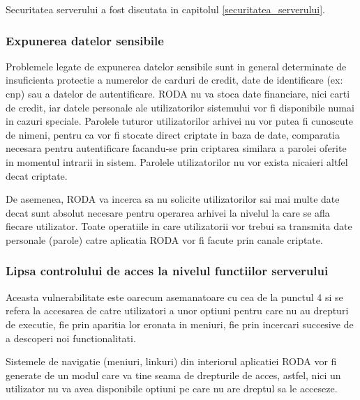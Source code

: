 {\sffamily\color{black}
Securitatea serverului a fost discutata in capitolul
\ref{securitatea_serverului}.}


\bigskip

\subsubsection{Expunerea datelor sensibile}


\bigskip

{\sffamily\color{black}
Problemele legate de expunerea datelor sensibile sunt in general determinate de insuficienta protectie a numerelor de
carduri de credit, date de identificare (ex: cnp) sau a datelor de autentificare. RODA nu va stoca date financiare,
nici carti de credit, iar datele personale ale utilizatorilor sistemului vor fi disponibile numai in cazuri speciale.
Parolele tuturor utilizatorilor arhivei nu vor putea fi cunoscute de nimeni, pentru ca vor fi stocate direct criptate
in baza de date, comparatia necesara pentru autentificare facandu-se prin criptarea similara a parolei oferite in
momentul intrarii in sistem. Parolele utilizatorilor nu vor exista nicaieri altfel decat criptate.}


\bigskip

{\sffamily\color{black}
De asemenea, RODA va incerca sa nu solicite utilizatorilor sai mai multe date decat sunt absolut necesare pentru
operarea arhivei la nivelul la care se afla fiecare utilizator. Toate operatiile in care utilizatorii vor trebui sa
transmita date personale (parole) catre aplicatia RODA vor fi facute prin canale criptate. }

\bigskip

\subsubsection{Lipsa controlului de acces la nivelul functiilor serverului}

\bigskip

{\sffamily\color{black}
Aceasta vulnerabilitate este oarecum asemanatoare cu cea de la punctul 4 si se refera la accesarea de catre utilizatori
a unor optiuni pentru care nu au drepturi de executie, fie prin aparitia lor eronata in meniuri, fie prin incercari
succesive de a descoperi noi functionalitati. }

\bigskip

{\sffamily\color{black}
Sistemele de navigatie (meniuri, linkuri) din interiorul aplicatiei RODA vor fi generate de un modul care va tine seama
de drepturile de acces, astfel, nici un utilizator nu va avea disponibile optiuni pe care nu are dreptul sa le
acceseze. }

